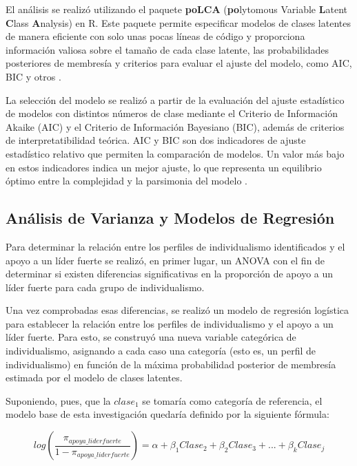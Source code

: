 \documentclass[12pt,oneside]{templates/facsothesis}
\begin{document}
El análisis se realizó utilizando el paquete \textbf{poLCA} (\textbf{po}lytomous Variable \textbf{L}atent \textbf{C}lass \textbf{A}nalysis) en R. Este paquete permite especificar modelos de clases latentes de manera eficiente con solo unas pocas líneas de código y proporciona información valiosa sobre el tamaño de cada clase latente, las probabilidades posteriores de membresía y criterios para evaluar el ajuste del modelo, como AIC, BIC y otros \citep{linzer2011}.

La selección del modelo se realizó a partir de la evaluación del ajuste estadístico de modelos con distintos números de clase mediante el Criterio de Información Akaike (AIC) y el Criterio de Información Bayesiano (BIC), además de criterios de interpretatibilidad teórica. AIC y BIC son dos indicadores de ajuste estadístico relativo que permiten la comparación de modelos. Un valor más bajo en estos indicadores indica un mejor ajuste, lo que representa un equilibrio óptimo entre la complejidad y la parsimonia del modelo \citep{collins2010}.

\hypertarget{anuxe1lisis-de-varianza-y-modelos-de-regresiuxf3n}{%
\subsection*{Análisis de Varianza y Modelos de Regresión}\label{anuxe1lisis-de-varianza-y-modelos-de-regresiuxf3n}}

Para determinar la relación entre los perfiles de individualismo identificados y el apoyo a un líder fuerte se realizó, en primer lugar, un ANOVA con el fin de determinar si existen diferencias significativas en la proporción de apoyo a un líder fuerte para cada grupo de individualismo.

Una vez comprobadas esas diferencias, se realizó un modelo de regresión logística para establecer la relación entre los perfiles de individualismo y el apoyo a un líder fuerte. Para esto, se construyó una nueva variable categórica de individualismo, asignando a cada caso una categoría (esto es, un perfil de individualismo) en función de la máxima probabilidad posterior de membresía estimada por el modelo de clases latentes.

Suponiendo, pues, que la \(clase_1\) se tomaría como categoría de referencia, el modelo base de esta investigación quedaría definido por la siguiente fórmula:

\[log(\frac{\pi_{apoya\_liderfuerte}}
{1-\pi_{apoya\_liderfuerte}}) = \alpha + \beta_1Clase_2 + \beta_2Clase_3 + ... + \beta_kClase_j \]
\end{document}
